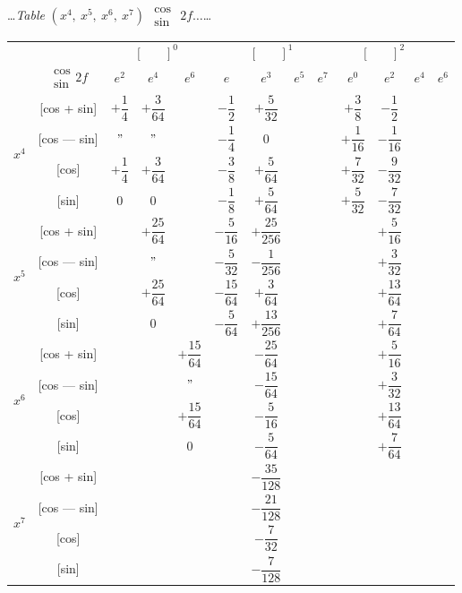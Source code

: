 \documentclass[10pt,a4paper]{article}
\newcommand{\tabletitle}[2]{%
  \begin{center}
  \ldots\textit{Table} #1 $\displaystyle\begin{smallmatrix} \cos \\ \sin \end{smallmatrix}$ #2\ldots
  \end{center}
}
\begin{document}
\vspace{1em}

\tabletitle{$(x^4,\ x^5,\ x^6,\ x^7)$}{$2f\ldots$}

\begin{center}
\small
\begin{tabular}{|c|c|c|c|c|c|c|c|c|c|c|c|}
\hline
& &  &  &  \\
& $\begin{smallmatrix} \cos \\ \sin \end{smallmatrix} 2f$ & $e^2$ & $e^4$ & $e^6$ & $e$ & $e^3$ & $e^5$ & $e^7$ & $e^0$ & $e^2$ & $e^4$ & $e^6$ \\
\hline
{} & [cos + sin] & $+\dfrac{1}{4}$ & $+\dfrac{3}{64}$ & & $-\dfrac{1}{2}$ & $+\dfrac{5}{32}$ & & & $+\dfrac{3}{8}$ & $-\dfrac{1}{2}$ \\
& [cos --- sin] & $"$ & $"$ & & $-\dfrac{1}{4}$ & $0$ & & & $+\dfrac{1}{16}$ & $-\dfrac{1}{16}$ \\
& [cos] & $+\dfrac{1}{4}$ & $+\dfrac{3}{64}$ & & $-\dfrac{3}{8}$ & $+\dfrac{5}{64}$ & & & $+\dfrac{7}{32}$ & $-\dfrac{9}{32}$ \\
& [sin] & $0$ & $0$ & & $-\dfrac{1}{8}$ & $+\dfrac{5}{64}$ & & & $+\dfrac{5}{32}$ & $-\dfrac{7}{32}$ \\
\hline
{} & [cos + sin] & & $+\dfrac{25}{64}$ & & $-\dfrac{5}{16}$ & $+\dfrac{25}{256}$ & & & & $+\dfrac{5}{16}$ \\
& [cos --- sin] & & $"$ & & $-\dfrac{5}{32}$ & $-\dfrac{1}{256}$ & & & & $+\dfrac{3}{32}$ \\
& [cos] & & $+\dfrac{25}{64}$ & & $-\dfrac{15}{64}$ & $+\dfrac{3}{64}$ & & & & $+\dfrac{13}{64}$ \\
& [sin] & & $0$ & & $-\dfrac{5}{64}$ & $+\dfrac{13}{256}$ & & & & $+\dfrac{7}{64}$ \\
\hline
{} & [cos + sin] & & & $+\dfrac{15}{64}$ & & $-\dfrac{25}{64}$ & & & & $+\dfrac{5}{16}$ \\
& [cos --- sin] & & & $"$ & & $-\dfrac{15}{64}$ & & & & $+\dfrac{3}{32}$ \\
& [cos] & & & $+\dfrac{15}{64}$ & & $-\dfrac{5}{16}$ & & & & $+\dfrac{13}{64}$ \\
& [sin] & & & $0$ & & $-\dfrac{5}{64}$ & & & & $+\dfrac{7}{64}$ \\
\hline
{} & [cos + sin] & & & & & $-\dfrac{35}{128}$ & & & \\
& [cos --- sin] & & & & & $-\dfrac{21}{128}$ & & & \\
& [cos] & & & & & $-\dfrac{7}{32}$ & & & \\
& [sin] & & & & & $-\dfrac{7}{128}$ & & & \\
\hline
\end{tabular}
\end{center}
\end{document}
